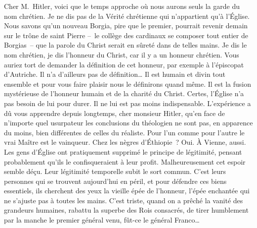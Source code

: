 \documentclass[french,twoside]{book} %
\begin{document}
Cher M. Hitler, voici que le temps approche où nous aurons seuls la garde du nom chrétien. Je ne dis pas de la Vérité chrétienne qui n’appartient qu’à l’Église. Nous savons qu’un nouveau Borgia, pire que le premier, pourrait revenir demain sur le trône de saint Pierre – le collège des cardinaux se composer tout entier de Borgias – que la parole du Christ serait en sûreté dans de telles mains. Je dis le nom chrétien, je dis l’honneur du Christ, car il y a un honneur chrétien. Vous auriez tort de demander la définition de cet honneur, par exemple à l’épiscopat d’Autriche. Il n’a d’ailleurs pas de définition… Il est humain et divin tout ensemble et pour vous faire plaisir nous le définirons quand même. Il est la fusion mystérieuse de l’honneur humain et de la charité du Christ. Certes, l’Église n’a pas besoin de lui pour durer. Il ne lui est pas moins indispensable. L’expérience a dû vous apprendre depuis longtemps, cher monsieur Hitler, qu’en face de n’importe quel usurpateur les conclusions du théologien ne sont pas, en apparence du moins, bien différentes de celles du réaliste. Pour l’un comme pour l’autre le vrai Maître est le vainqueur. Chez les nègres d’Éthiopie ? Oui. À Vienne, aussi. Les gens d’Église ont pratiquement supprimé le principe de légitimité, pensant probablement qu’ils le confisqueraient à leur profit. Malheureusement cet espoir semble déçu. Leur légitimité temporelle subit le sort commun. C’est leurs personnes qui se trouvent aujourd’hui en péril, et pour défendre ces biens essentiels, ils cherchent des yeux la vieille épée de l’honneur, l’épée enchantée qui ne s’ajuste pas à toutes les mains. C’est triste, quand on a prêché la vanité des grandeurs humaines, rabattu la superbe des Rois consacrés, de tirer humblement par la manche le premier général venu, fût-ce le général Franco…\par
\end{document}

